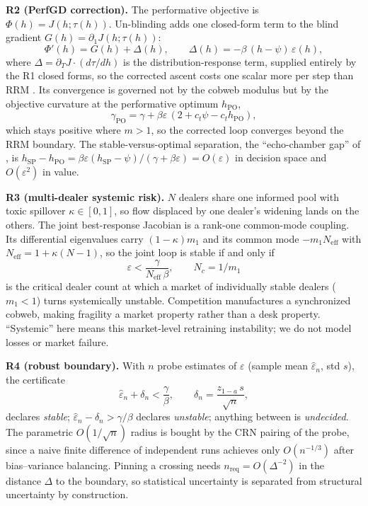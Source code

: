 \documentclass[sigconf,anonymous,review]{acmart}
\newcommand{\eps}{\varepsilon}
\newcommand{\Neff}{N_{\mathrm{eff}}}
\newcommand{\hSP}{h_{\mathrm{SP}}}
\newcommand{\hPO}{h_{\mathrm{PO}}}
\newcommand{\gPO}{\gamma_{\mathrm{PO}}}
\begin{document}
\textbf{R2 (PerfGD correction).} The performative objective is
$\Phi(h)=J(h;\tau(h))$. Un-blinding adds one closed-form term to the blind
gradient $G(h)=\partial_1 J(h;\tau(h))$:
\begin{equation}
\Phi'(h)=G(h)+\Delta(h),\qquad
\Delta(h)=-\beta\,(h-\psi)\,\eps(h),
\label{eq:perfgd}
\end{equation}
where $\Delta=\partial_T J\cdot(d\tau/dh)$ is the distribution-response term,
supplied entirely by the R1 closed forms, so the corrected ascent costs one
scalar more per step than RRM \cite{izzo2021learn}. Its convergence is
governed not by the cobweb modulus but by the objective curvature at the
performative optimum $\hPO$,
\begin{equation}
\gPO=\gamma+\beta\eps\,(2+c_t\psi-c_t\hPO),
\label{eq:gpo}
\end{equation}
which stays positive where $m>1$, so the corrected loop converges beyond the
RRM boundary. The stable-versus-optimal separation, the ``echo-chamber gap''
of \cite{miller2021echo}, is
$\hSP-\hPO=\beta\eps(\hSP-\psi)/(\gamma+\beta\eps)=O(\eps)$ in decision
space and $O(\eps^2)$ in value.

\textbf{R3 (multi-dealer systemic risk).} $N$ dealers share one informed pool
with toxic spillover $\kappa\in[0,1]$, so flow displaced by one dealer's
widening lands on the others. The joint best-response Jacobian is a rank-one
common-mode coupling. Its differential eigenvalues carry $(1-\kappa)m_1$ and
its common mode $-m_1\Neff$ with $\Neff=1+\kappa(N-1)$, so the joint loop is
stable if and only if
\begin{equation}
\eps<\frac{\gamma}{\Neff\,\beta},
\qquad
N_c=1/m_1
\label{eq:multidealer}
\end{equation}
is the critical dealer count at which a market of individually stable dealers
($m_1<1$) turns systemically unstable. Competition manufactures a
synchronized cobweb, making fragility a market property rather than a desk
property. ``Systemic'' here means this market-level retraining instability;
we do not model losses or market failure.

\textbf{R4 (robust boundary).} With $n$ probe estimates of $\eps$ (sample
mean $\hat\eps_n$, std $s$), the certificate
\begin{equation}
\hat\eps_n+\delta_n<\frac{\gamma}{\beta},\qquad
\delta_n=\frac{z_{1-a}\,s}{\sqrt{n}},
\label{eq:robust}
\end{equation}
declares \emph{stable}; $\hat\eps_n-\delta_n>\gamma/\beta$ declares
\emph{unstable}; anything between is \emph{undecided}. The parametric
$O(1/\sqrt{n})$ radius is bought by the CRN pairing of the probe, since a
naive finite difference of independent runs achieves only $O(n^{-1/3})$ after
bias--variance balancing. Pinning a crossing needs
$n_{\mathrm{req}}=O(\Delta^{-2})$ in the distance $\Delta$ to the boundary,
so statistical uncertainty is separated from structural uncertainty by
construction.
\end{document}
